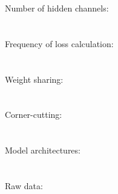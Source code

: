 \documentclass{article}
\begin{document}
Number of hidden channels:\\
\\\\

Frequency of loss calculation:\\
\\\\

Weight sharing:\\
\\\\

Corner-cutting:\\
\\\\

Model architectures:\\
\\\\

Raw data:\\

\end{document}
